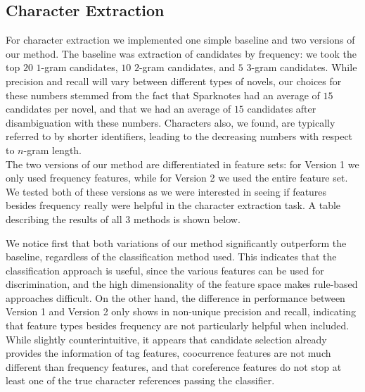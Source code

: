 \documentclass[12pt]{article}
\begin{document}
    \subsection{Character Extraction}
        
        For character extraction we implemented one simple baseline and two versions of our method.
        The baseline was extraction of candidates by frequency: we took the top $20$ $1$-gram candidates,
        $10$ $2$-gram candidates, and $5$ $3$-gram candidates. While precision and recall will vary
        between different types of novels, our choices for these numbers stemmed
        from the fact that Sparknotes had an average of $15$ candidates per novel, and that we had an average of
        $15$ candidates after disambiguation with these numbers. Characters also, we found, are typically
        referred to by shorter identifiers, leading to the decreasing numbers with respect to $n$-gram length. \\

        The two versions of our method are differentiated in feature sets: for Version 1 we only used
        frequency features, while for Version 2 we used the entire feature set. We tested both of these versions
        as we were interested in seeing if features besides frequency really were helpful in the character
        extraction task. A table describing the results of all $3$ methods is shown below. 


        We notice first that both variations of our method significantly outperform the baseline, regardless
        of the classification method used. This indicates that the classification approach is useful,
        since the various features can be used for discrimination, and the high dimensionality of the feature
        space makes rule-based approaches difficult. On the other hand, the difference in performance
        between Version 1 and Version 2 only shows in non-unique precision and recall, indicating that
        feature types besides frequency are not particularly helpful when included. While slightly
        counterintuitive, it appears that candidate selection already provides the information of tag
        features, coocurrence features are not much different than frequency features, and that coreference
        features do not stop at least one of the true character references passing the classifier. \\
\end{document}

